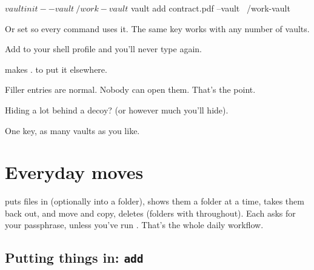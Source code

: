 \documentclass[10pt,oneside,openany]{book}
\begin{document}
\begin{shell}
$ vault init --vault ~/work-vault
$ vault add contract.pdf --vault ~/work-vault
\end{shell}

Or set  so every command uses it. The same key works with any
number of vaults.

\begin{quickwin}
Add  to your shell profile and you'll never
type  again.
\end{quickwin}

\begin{pocket}
\begin{pocketlist}
  \item {} makes .  to put it elsewhere.
  \item Filler entries are normal. Nobody can open them. That's the point.
  \item Hiding a lot behind a decoy?  (or however much you'll hide).
  \item One key, as many vaults as you like.
\end{pocketlist}
\end{pocket}

\chapter{Everyday moves}

\begin{tldr}
 puts files in (optionally into a folder),  shows them a
folder at a time,  takes them back out,  and  move
and copy,  deletes (folders with  throughout). Each asks for
your passphrase, unless you've run . That's the whole daily
workflow.
\end{tldr}

\section{Putting things in: \texttt{add}}

\end{document}
